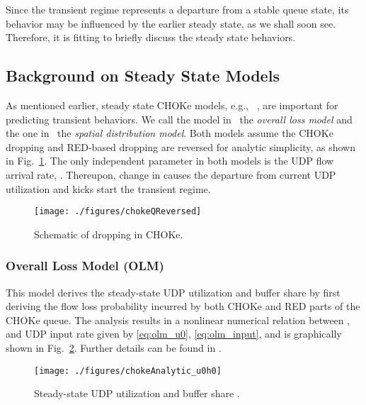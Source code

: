 \documentclass{IEEEtran}
\begin{document}
    Since the transient regime represents a departure from a stable queue state, its behavior may be influenced by the earlier steady state, as we shall soon see. Therefore, it is fitting to briefly discuss the steady state behaviors.

    \subsection{Background on Steady State Models}\label{subsec:backgrnd}
    As mentioned earlier, steady state CHOKe models, e.g., ~\cite{ChokeToN04,ChokeSigmetrics03}, are important for predicting transient behaviors. We call the model in~\cite{ChokeSigmetrics03} the \emph{overall loss model} and the one in~\cite{ChokeToN04} the \emph{spatial distribution model}. Both models assume the CHOKe dropping and RED-based dropping are reversed for analytic simplicity, as shown in Fig.~\ref{fig:chokeQReveresed}. The only independent parameter in both models is the UDP flow arrival rate, . Thereupon, change in  causes the departure from current UDP utilization and kicks start the transient regime.

        \begin{figure}[tbh!]
            \centering
            \texttt{[image: ./figures/chokeQReversed]}\caption{Schematic of dropping in CHOKe.}
            \label{fig:chokeQReveresed}
    \end{figure}

    \subsubsection{Overall Loss Model (OLM)}\label{subsub:olmModel}
    This model derives the steady-state UDP utilization  and buffer share  by first deriving the flow loss probability incurred by both CHOKe and RED parts of the CHOKe queue. The analysis results in a nonlinear numerical relation between ,  and UDP input rate   given by \eqref{eq:olm_u0}, \eqref{eq:olm_input}, and is graphically shown in Fig.~\ref{fig:olm-steadystate}. Further details can be found in \cite{ChokeSigmetrics03}.

        

       

          \begin{figure}[h]
            \centering
            \texttt{[image: ./figures/chokeAnalytic\_u0h0]}\caption{Steady-state UDP utilization  and buffer share .}
            \label{fig:olm-steadystate}
      \end{figure}
\end{document}
